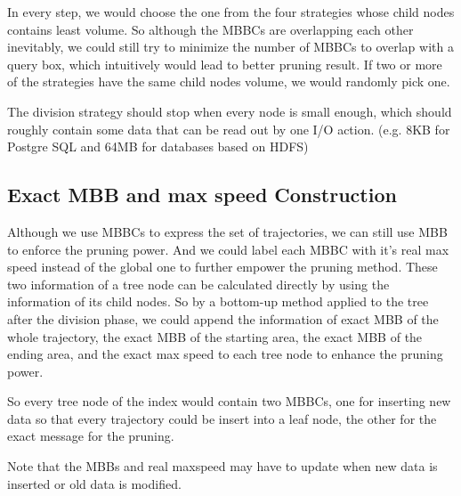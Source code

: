 \documentclass[sigplan]{acmart}
\begin{document}
In every step, we would choose the one from the four strategies whose child nodes contains least volume. So although the MBBCs are overlapping each other inevitably, we could still try to minimize the number of MBBCs to overlap with a query box, which intuitively would lead to better pruning result. If two or more of the strategies have the same child nodes volume, we would randomly pick one.\par

The division strategy should stop when every node is small enough, which should roughly contain some data that can be read out by one I/O action. (e.g. 8KB for Postgre SQL and 64MB for databases based on HDFS)

\subsection{Exact MBB and max speed Construction}
Although we use MBBCs to express the set of trajectories, we can still use MBB to enforce the pruning power. And we could label each MBBC with it's real max speed instead of the global one to further empower the pruning method. These two information of a tree node can be calculated directly by using the information of its child nodes. So by a bottom-up method applied to the tree after the division phase, we could append the information of exact MBB of the whole trajectory, the exact MBB of the starting area, the exact MBB of the ending area, and the exact max speed to each tree node to enhance the pruning power. \par
So every tree node of the index would contain two MBBCs, one for inserting new data so that every trajectory could be insert into a leaf node, the other for the exact message for the pruning.\par
Note that the MBBs and real maxspeed may have to update when new data is inserted or old data is modified.\par
\end{document}
